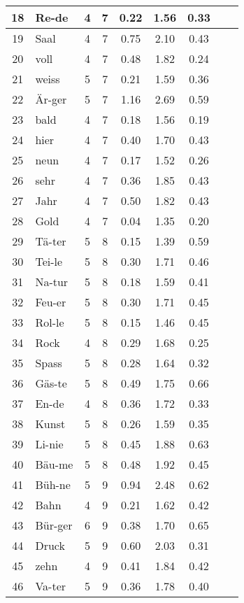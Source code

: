 {\begin{longtable}{clccccccc}
18 & Re-de & 4 & 7 & 0.22 & 1.56 & 0.33 \\ \hline
19 & Saal & 4 & 7 & 0.75 & 2.10 & 0.43 \\ \hline
20 & voll & 4 & 7 & 0.48 & 1.82 & 0.24 \\ \hline
21 & weiss & 5 & 7 & 0.21 & 1.59 & 0.36 \\ \hline
22 & Är-ger & 5 & 7 & 1.16 & 2.69 & 0.59 \\ \hline
23 & bald & 4 & 7 & 0.18 & 1.56 & 0.19 \\ \hline
24 & hier & 4 & 7 & 0.40 & 1.70 & 0.43 \\ \hline
25 & neun & 4 & 7 & 0.17 & 1.52 & 0.26 \\ \hline
26 & sehr & 4 & 7 & 0.36 & 1.85 & 0.43 \\ \hline
27 & Jahr & 4 & 7 & 0.50 & 1.82 & 0.43 \\ \hline
28 & Gold & 4 & 7 & 0.04 & 1.35 & 0.20 \\ \hline
29 & Tä-ter & 5 & 8 & 0.15 & 1.39 & 0.59 \\ \hline
30 & Tei-le & 5 & 8 & 0.30 & 1.71 & 0.46 \\ \hline
31 & Na-tur & 5 & 8 & 0.18 & 1.59 & 0.41 \\ \hline
32 & Feu-er & 5 & 8 & 0.30 & 1.71 & 0.45 \\ \hline
33 & Rol-le & 5 & 8 & 0.15 & 1.46 & 0.45 \\ \hline
34 & Rock & 4 & 8 & 0.29 & 1.68 & 0.25 \\ \hline
35 & Spass & 5 & 8 & 0.28 & 1.64 & 0.32 \\ \hline
36 & Gäs-te & 5 & 8 & 0.49 & 1.75 & 0.66 \\ \hline
37 & En-de & 4 & 8 & 0.36 & 1.72 & 0.33 \\ \hline
38 & Kunst & 5 & 8 & 0.26 & 1.59 & 0.35 \\ \hline
39 & Li-nie & 5 & 8 & 0.45 & 1.88 & 0.63 \\ \hline
40 & Bäu-me & 5 & 8 & 0.48 & 1.92 & 0.45 \\ \hline
41 & Büh-ne & 5 & 9 & 0.94 & 2.48 & 0.62 \\ \hline
42 & Bahn & 4 & 9 & 0.21 & 1.62 & 0.42 \\ \hline
43 & Bür-ger & 6 & 9 & 0.38 & 1.70 & 0.65 \\ \hline
44 & Druck & 5 & 9 & 0.60 & 2.03 & 0.31 \\ \hline
45 & zehn & 4 & 9 & 0.41 & 1.84 & 0.42 \\ \hline
46 & Va-ter & 5 & 9 & 0.36 & 1.78 & 0.40 \\ \hline

\end{longtable}}
